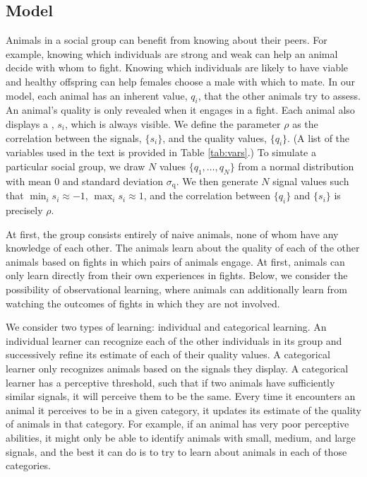 \subsection*{Model}
%
Animals in a social group can benefit from knowing about their peers. For example, knowing which individuals are strong and weak can help an animal decide with whom to fight. Knowing which individuals are likely to have viable and healthy offspring can help females choose a male with which to mate. In our model, each animal has an inherent  value, $q_i$, that the other animals try to assess. An animal's quality is only revealed when it engages in a fight. Each animal also displays a , $s_i$, which is always visible. We define the parameter $\rho$ as the correlation between the signals, $\{s_i\}$, and the quality values, $\{q_i\}$. (A list of the variables used in the text is provided in Table \ref{tab:vars}.) To simulate a particular social group, we draw $N$ values $\{q_1,\dots,q_N\}$ from a normal distribution with mean $0$ and standard deviation $\sigma_\text{q}$. We then generate $N$ signal values such that $\min_i{s_i}\approx -1$, $\max_i{s_i}\approx 1$, and the correlation between $\{q_i\}$ and $\{s_i\}$ is precisely $\rho$.
  
At first, the group consists entirely of naive animals, none of whom have any knowledge of each other. The animals learn about the quality of each of the other animals based on fights in which pairs of animals engage. At first, animals can only learn directly from their own experiences in fights. Below, we consider the possibility of observational learning, where animals can additionally learn from watching the outcomes of fights in which they are not involved.  

We consider two types of learning: individual and categorical learning. An individual learner can recognize each of the other individuals in its group and successively refine its estimate of each of their quality values. A categorical learner only recognizes animals based on the signals they display. A categorical learner has a perceptive threshold, such that if two animals have sufficiently similar signals, it will perceive them to be the same. Every time it encounters an animal it perceives to be in a given category, it updates its estimate of the quality of animals in that category. For example, if an animal has very poor perceptive abilities, it might only be able to identify animals with small, medium, and large signals, and the best it can do is to try to learn about animals in each of those categories. 

